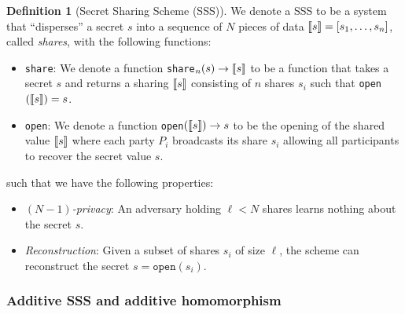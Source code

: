 \documentclass[11pt]{report}
\theoremstyle{definition}
\newtheorem{definition}{Definition}[section]
\theoremstyle{plain}
\begin{document}
\begin{definition}[Secret Sharing Scheme (SSS)]\label{def:ss-share}
  We denote a SSS to be a system that ``disperses'' a secret $s$ into a sequence of $N$ pieces of data $\llbracket s \rrbracket = [s_1, \dots, s_n]$, called \emph{shares}, with the following functions:
  \begin{itemize}
    \item \texttt{share}: We denote a function \texttt{share}$_n(s) \rightarrow \llbracket s \rrbracket$ to be a function that takes a secret $s$ and returns a sharing $\llbracket s \rrbracket$ consisting of $n$ shares $s_i$ such that \texttt{open}$(\llbracket s \rrbracket) = s$.
    \item \texttt{open}: We denote a function \texttt{open}$(\llbracket s \rrbracket) \rightarrow s$ to be the opening of the shared value $\llbracket s \rrbracket$ where each party $P_i$ broadcasts its share $s_i$ allowing all participants to recover the secret value $s$.
  \end{itemize}
  such that we have the following properties:
  \begin{itemize}[parsep=0pt, itemsep=0pt]
    \item \textit{$(N-1)$-privacy}: An adversary holding $\ell < N$ shares learns nothing about the secret $s$.
    \item \textit{Reconstruction}: Given a subset of shares $s_i$ of size $\ell$, the scheme can reconstruct the secret $s = \texttt{open}(s_i)$.
  \end{itemize}
\end{definition}

\subsubsection{Additive SSS and additive homomorphism}\label{sec:additive-sss}
\end{document}
